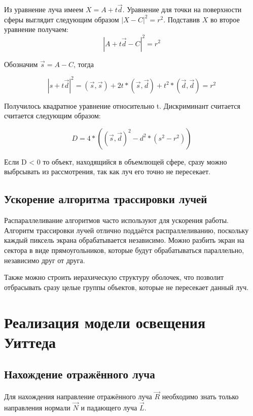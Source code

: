 \documentclass[12pt,a4paper,oneside]{report}
\begin{document}
				Из уравнение луча имеем $X = A + t\vec{d}$. Уравнение для точки на поверхности сферы выглядит следующим образом $|X - C|^2 = r^2$. Подставив $X$ во второе уравнение получаем: 
				\[
    				|A + t\vec{d} - C|^2 = r^2
				\]
				
				Обозначим $\vec{s} = A - C$, тогда
				
				\[
    				|s + t\vec{d}|^2 = (\vec{s}, \vec{s}) + 2t*(\vec{s}, \vec{d}) + t^2*(\vec{d}, \vec{d}) = r^2
				\]
				
				Получилось квадратное уравнение относительно t. Дискриминант считается считается следующим образом:
				
				\[
    				D = 4*((\vec{s}, \vec{d})^2 - d^2*(s^2 - r^2))    				
				\]
				
				
				Если D < 0 то объект, находящийся в объемлющей сфере, сразу можно выбрсывать из рассмотрения, так как луч его точно не пересекает.
			\subsection{Ускорение алгоритма трассировки лучей}
				\quad Распараллеливание алгоритмов часто используют для ускорения работы. Алгоритм трассировки лучей отлично поддаётся распраллеливанию, поскольку каждый пиксель экрана обрабатывается независимо. Можно разбить экран на сектора в виде прямоугольников, которые будут обрабатываться параллельно, независимо друг от  друга. 
				
				Также можно строить иерахическую структуру оболочек, что позволит отбрасывать сразу целые группы объектов, которые не пересекает данный луч.
		\section{Реализация модели освещения Уиттеда}
			\subsection{Нахождение отражённого луча}
				\quad Для нахождения направление отражённого луча $\vec{R}$ необходимо знать только направления нормали $\vec{N}$ и падающего луча $\vec{L}$.
				
\end{document}
